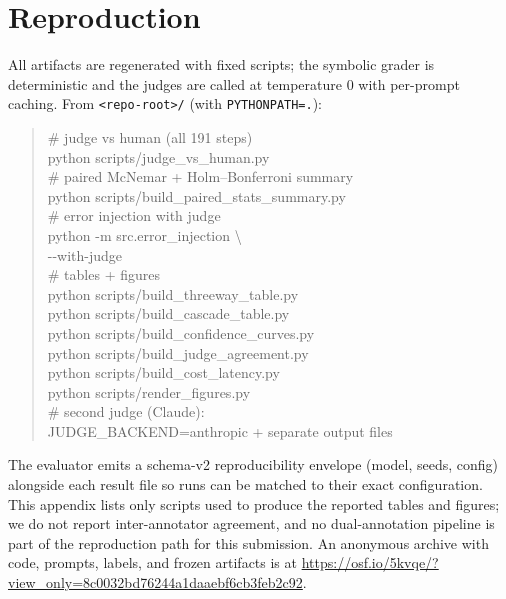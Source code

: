 \section{Reproduction}
\label{app:repro}

All artifacts are regenerated with fixed scripts; the symbolic grader is
deterministic and the judges are called at temperature $0$ with per-prompt
caching. From \texttt{<repo-root>/} (with \texttt{PYTHONPATH=.}):

\begin{quote}\small\ttfamily
\# judge vs human (all 191 steps)\\
python scripts/judge\_vs\_human.py\\[2pt]
\# paired McNemar + Holm--Bonferroni summary\\
python scripts/build\_paired\_stats\_summary.py\\[2pt]
\# error injection with judge\\
python -m src.error\_injection \textbackslash\\
\hspace*{1em}-{}-with-judge\\[2pt]
\# tables + figures\\
python scripts/build\_threeway\_table.py\\
python scripts/build\_cascade\_table.py\\
python scripts/build\_confidence\_curves.py\\
python scripts/build\_judge\_agreement.py\\
python scripts/build\_cost\_latency.py\\
python scripts/render\_figures.py\\[2pt]
\# second judge (Claude):\\
\hspace*{1em}JUDGE\_BACKEND=anthropic + separate output files
\end{quote}

The evaluator emits a schema-v2 reproducibility envelope (model, seeds, config)
alongside each result file so runs can be matched to their exact configuration.
This appendix lists only scripts used to produce the reported tables and figures;
we do not report inter-annotator agreement, and no dual-annotation pipeline is
part of the reproduction path for this submission. An anonymous archive with
code, prompts, labels, and frozen artifacts is at \url{https://osf.io/5kvqe/?view_only=8c0032bd76244a1daaebf6cb3feb2c92}.
